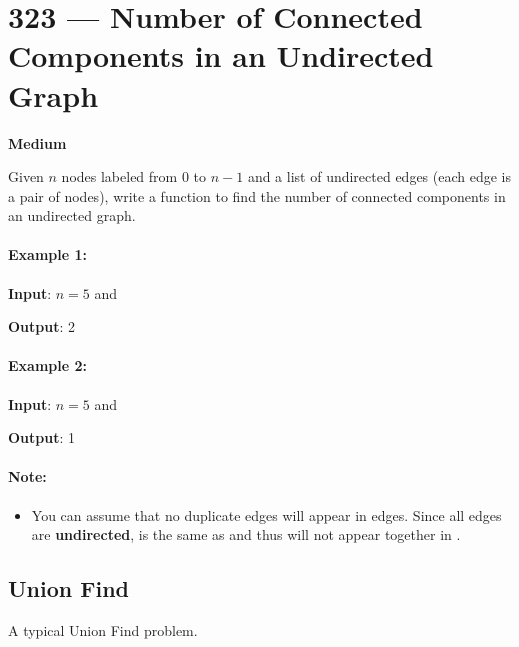 \section{323 --- Number of Connected Components in an Undirected Graph}

\textbf{Medium}

Given $n$ nodes labeled from 0 to $n - 1$ and a list of undirected edges (each edge is a pair of nodes), write a function to find the number of connected components in an undirected graph.

\paragraph{Example 1:}

\begin{flushleft}
\textbf{Input}: $n = 5$ and 

\textbf{Output}: 2
\end{flushleft}

\paragraph{Example 2:}

\begin{flushleft}
\textbf{Input}: $ n = 5 $ and 

\textbf{Output}:  1
\end{flushleft}

\paragraph{Note:}
\begin{itemize}
\item You can assume that no duplicate edges will appear in edges. Since all edges are \textbf{undirected}, \fcj{[0, 1]} is the same as \fcj{[1, 0]} and thus will not appear together in .
\end{itemize}

\subsection{Union Find}
A typical Union Find problem.

